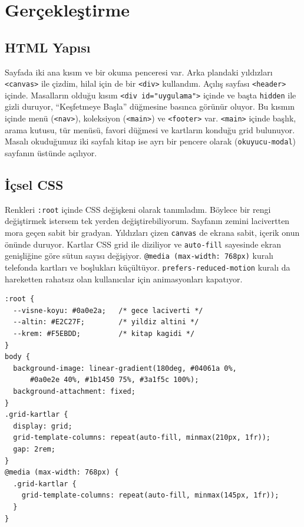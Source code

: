 \documentclass[12pt,a4paper]{article}
\begin{document}
\section{Gerçekleştirme}
\subsection{HTML Yapısı}
Sayfada iki ana kısım ve bir okuma penceresi var. Arka plandaki yıldızları \texttt{<canvas>} ile çizdim, hilal için de bir \texttt{<div>} kullandım. Açılış sayfası \texttt{<header>} içinde. Masalların olduğu kısım \texttt{<div id="uygulama">} içinde ve başta \texttt{hidden} ile gizli duruyor, ``Keşfetmeye Başla'' düğmesine basınca görünür oluyor. Bu kısmın içinde menü (\texttt{<nav>}), koleksiyon (\texttt{<main>}) ve \texttt{<footer>} var. \texttt{<main>} içinde başlık, arama kutusu, tür menüsü, favori düğmesi ve kartların konduğu grid bulunuyor. Masalı okuduğumuz iki sayfalı kitap ise ayrı bir pencere olarak (\texttt{okuyucu-modal}) sayfanın üstünde açılıyor.

\subsection{İçsel CSS}
Renkleri \texttt{:root} içinde CSS değişkeni olarak tanımladım. Böylece bir rengi değiştirmek istersem tek yerden değiştirebiliyorum. Sayfanın zemini lacivertten mora geçen sabit bir gradyan. Yıldızları çizen \texttt{canvas} de ekrana sabit, içerik onun önünde duruyor. Kartlar CSS grid ile diziliyor ve \texttt{auto-fill} sayesinde ekran genişliğine göre sütun sayısı değişiyor. \texttt{@media (max-width: 768px)} kuralı telefonda kartları ve boşlukları küçültüyor. \texttt{prefers-reduced-motion} kuralı da hareketten rahatsız olan kullanıcılar için animasyonları kapatıyor.

\begin{lstlisting}[caption={İçsel CSS'ten önemli bir bölüm}]
:root {
  --visne-koyu: #0a0e2a;   /* gece laciverti */
  --altin: #E2C27F;        /* yildiz altini */
  --krem: #F5EBDD;         /* kitap kagidi */
}
body {
  background-image: linear-gradient(180deg, #04061a 0%,
      #0a0e2e 40%, #1b1450 75%, #3a1f5c 100%);
  background-attachment: fixed;
}
.grid-kartlar {
  display: grid;
  grid-template-columns: repeat(auto-fill, minmax(210px, 1fr));
  gap: 2rem;
}
@media (max-width: 768px) {
  .grid-kartlar {
    grid-template-columns: repeat(auto-fill, minmax(145px, 1fr));
  }
}
\end{lstlisting}
\end{document}
